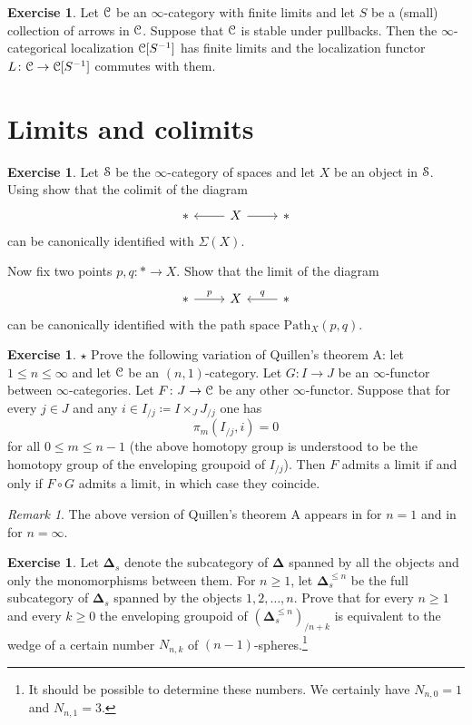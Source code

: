 \documentclass[10pt,a4paper,reqno,oneside]{book} %
\theoremstyle{plain}
\theoremstyle{definition}
\newtheorem{exercise}[thm]{Exercise}
\theoremstyle{remark}
\newtheorem{rem}[thm]{Remark}
\numberwithin{equation}{section}
\begin{document}
\begin{exercise}
	Let $\mathcal C$ be an $\infty$-category with finite limits and let $S$ be a (small) collection of arrows in $\mathcal C$.
	Suppose that $\mathcal C$ is stable under pullbacks.
	Then the $\infty$-categorical localization $\mathcal C[S^{-1}]$ has finite limits and the localization functor $L \colon \mathcal C \to \mathcal C[S^{-1}]$ commutes with them.
\end{exercise}

\section{Limits and colimits}

\begin{exercise}
	Let $\mathcal S$ be the $\infty$-category of spaces and let $X$ be an object in $\mathcal S$.
	Using \cite[Theorem 4.2.4.1]{HTT} show that the colimit of the diagram
	\[ \begin{tikzcd}
		* & X \arrow{l} \arrow{r} & *
	\end{tikzcd} \]
	can be canonically identified with $\Sigma(X)$.
	
	Now fix two points $p, q \colon * \to X$. Show that the limit of the diagram
	\[ \begin{tikzcd}
		* \arrow{r}{p} & X & * \arrow{l}[swap]{q}
	\end{tikzcd} \]
	can be canonically identified with the path space $\mathrm{Path}_X(p,q)$.
\end{exercise}

\begin{exercise}
	$\star$ Prove the following variation of Quillen's theorem A: let $1 \le n \le \infty$ and let $\mathcal C$ be an $(n,1)$-category.
	Let $G \colon I \to J$ be an $\infty$-functor between $\infty$-categories.
	Let $F \colon J \to \mathcal C$ be any other $\infty$-functor.
	Suppose that for every $j \in J$ and any $i \in I_{/j} \coloneqq I \times_J J_{/j}$ one has
	\[ \pi_m( I_{/j}, i ) = 0 \]
	for all $0 \le m \le n-1$ (the above homotopy group is understood to be the homotopy group of the enveloping groupoid of $I_{/j}$).
	Then $F$ admits a limit if and only if $F \circ G$ admits a limit, in which case they coincide.
\end{exercise}

\begin{rem}
	The above version of Quillen's theorem A appears in \cite{MacLane_Categories} for $n = 1$ and in \cite[4.1.3.1]{HTT} for $n = \infty$.
\end{rem}

\begin{exercise}
	Let $\mathbf \Delta_s$ denote the subcategory of $\mathbf \Delta$ spanned by all the objects and only the monomorphisms between them.
	For $n \ge 1$, let $\mathbf \Delta^{\le n}_s$ be the full subcategory of $\mathbf \Delta_s$ spanned by the objects $1, 2, \ldots, n$.
	Prove that for every $n \ge 1$ and every $k \ge 0$ the enveloping groupoid of $(\mathbf \Delta^{\le n}_s)_{/n+k}$ is equivalent to the wedge of a certain number $N_{n,k}$ of $(n-1)$-spheres.\footnote{It should be possible to determine these numbers. We certainly have $N_{n,0} = 1$ and $N_{n,1} = 3$.}
\end{exercise}
\end{document}
